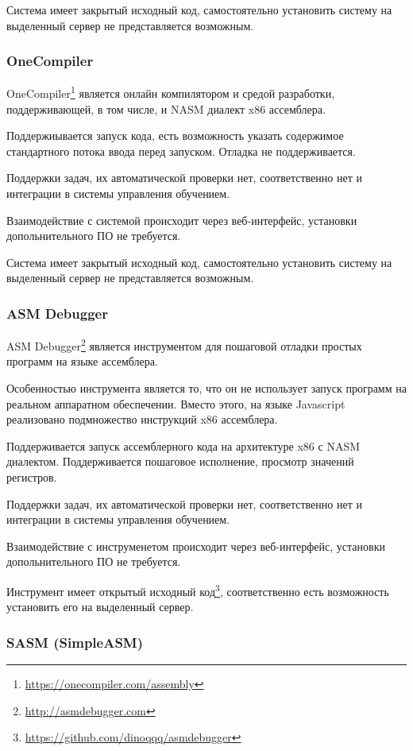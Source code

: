 \documentclass[a4paper,article,14pt]{extarticle}
\begin{document}
Система имеет закрытый исходный код, самостоятельно установить систему на выделенный сервер не представляется возможным.

\subsubsection{OneCompiler}

OneCompiler\footnote{\url{https://onecompiler.com/assembly}} является онлайн компилятором и средой разработки, поддерживающей, в том числе, и NASM диалект x86 ассемблера.

Поддержиывается запуск кода, есть возможность указать содержимое стандартного потока ввода перед запуском. Отладка не поддерживается.

Поддержки задач, их автоматической проверки нет, соответственно нет и интеграции в системы управления обучением.

Взаимодействие с системой происходит через веб-интерфейс, установки допольнительного ПО не требуется.

Система имеет закрытый исходный код, самостоятельно установить систему на выделенный сервер не представляется возможным.

\subsubsection{ASM Debugger}

ASM Debugger\footnote{\url{http://asmdebugger.com}} является инструментом для пошаговой отладки простых программ на языке ассемблера.

Особенностью инструмента является то, что он не использует запуск программ на реальном аппаратном обеспечении. Вместо этого, на языке Javascript реализовано подмножество инструкций x86 ассемблера.

Поддерживается запуск ассемблерного кода на архитектуре x86 с NASM диалектом. Поддерживается пошаговое исполнение, просмотр значений регистров.

Поддержки задач, их автоматической проверки нет, соответственно нет и интеграции в системы управления обучением.

Взаимодействие с инструменетом происходит через веб-интерфейс, установки допольнительного ПО не требуется.

Инструмент имеет открытый исходный код\footnote{\url{https://github.com/dinoqqq/asmdebugger}}, соответственно есть возможность установить его на выделенный сервер.

\subsubsection{SASM (SimpleASM)}
\end{document}
